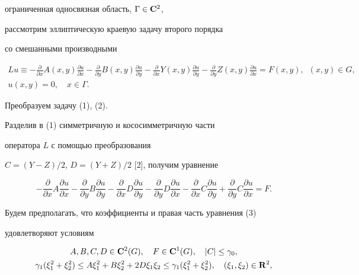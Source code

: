 ограниченная односвязная область, $\Gamma\in {\bold C}^2$,


рассмотрим эллиптическую краевую задачу второго порядка


со смешанными производными


\begin{gather}


Lu\equiv -\frac{\partial}{\partial x}A(x,y)\frac{\partial u}{\partial x}


-\frac{\partial}{\partial y}B(x,y)\frac{\partial u}{\partial y}


-\frac{\partial}{\partial x}Y(x,y)\frac{\partial u}{\partial y}


-\frac{\partial}{\partial y}Z(x,y)\frac{\partial u}{\partial x}=


F(x,y),\ \; (x,y)\in G,\\


%


u(x,y)=0,\quad x\in \Gamma.


\end{gather}


Преобразуем задачу (1), (2).


Разделив в (1) симметричную и кососимметричную части


оператора $L$ с помощью преобразования


$C=(Y-Z)/2$, $D=(Y+Z)/2$ [2], получим уравнение


\begin{equation}


-\frac{\partial}{\partial x}A\frac{\partial u}{\partial x}


-\frac{\partial}{\partial y}B\frac{\partial u}{\partial y}


-\frac{\partial}{\partial x}D\frac{\partial u}{\partial y}


-\frac{\partial}{\partial y}D\frac{\partial u}{\partial x}


-\frac{\partial}{\partial x}C\frac{\partial u}{\partial y}


+\frac{\partial}{\partial y}C\frac{\partial u}{\partial x}=F.


\end{equation}


Будем предполагать, что коэффициенты и правая часть уравнения (3) 


удовлетворяют условиям


\begin{gather*}


A,B,C,D \in {\bold C^2}(G),\quad F \in {\bold C}^1(G),\quad |C|\le\gamma_0,\\


\gamma_1 (\xi_1^2+\xi_2^2) \le A\xi_1^2+B\xi_2^2+2D\xi_1\xi_2


\le \gamma_1(\xi_1^2+\xi_2^2), \quad (\xi_1,\xi_2) \in {\bold R}^2,


\end{gather*}


